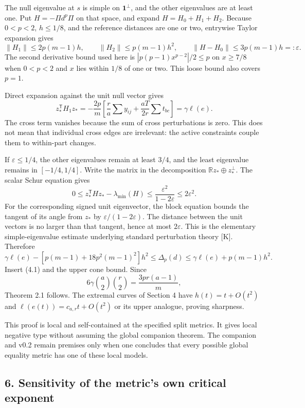 \documentclass[11pt,a4paper]{article}
\begin{document}
The null eigenvalue at \(s\) is simple on \(\mathbf1^\perp\), and the
other eigenvalues are at least one. Put \(H=-\Pi d^p\Pi\) on that space,
and expand \(H=H_0+H_1+H_2\). Because \(0<p<2\), \(h\le1/8\), and the
reference distances are one or two, entrywise Taylor expansion gives
\[\|H_1\|\le2p(m-1)h,\qquad
\|H_2\|\le p(m-1)h^2,\qquad
\|H-H_0\|\le3p(m-1)h=:\varepsilon.\] The second derivative bound used
here is \(|p(p-1)x^{p-2}|/2\le p\) on \(x\ge7/8\) when \(0<p<2\) and
\(x\) lies within \(1/8\) of one or two. This loose bound also covers
\(p=1\).

Direct expansion against the unit null vector gives
\[z_*^{\mathsf T}H_1z_*
=-\frac{2p}{m}\left[\frac ra\sum y_{ij}
+\frac{aT}{2r}\sum t_{bc}\right]=\gamma\ell(e).\] The cross term
vanishes because the sum of cross perturbations is zero. This does not
mean that individual cross edges are irrelevant: the active constraints
couple them to within-part changes.

If \(\varepsilon\le1/4\), the other eigenvalues remain at least \(3/4\),
and the least eigenvalue remains in \([-1/4,1/4]\). Write the matrix in
the decomposition \(\mathbb Rz_*\oplus z_*^\perp\). The scalar Schur
equation gives \[0\le z_*^{\mathsf T}Hz_*-\lambda_{\min}(H)
\le\frac{\varepsilon^2}{1-2\varepsilon}\le2\varepsilon^2.\] For the
corresponding signed unit eigenvector, the block equation bounds the
tangent of its angle from \(z_*\) by \(\varepsilon/(1-2\varepsilon)\).
The distance between the unit vectors is no larger than that tangent,
hence at most \(2\varepsilon\). This is the elementary simple-eigenvalue
estimate underlying standard perturbation theory {[}K{]}. Therefore
\[\gamma\ell(e)-[p(m-1)+18p^2(m-1)^2]h^2
\le\Delta_p(d)\le\gamma\ell(e)+p(m-1)h^2.\] Insert (4.1) and the upper
cone bound. Since \[6\gamma\binom a2\binom r2=\frac{3pr(a-1)}m,\]
Theorem 2.1 follows. The extremal curves of Section 4 have
\(h(t)=t+O(t^2)\) and \(\ell(e(t))=c_{a,r}t+O(t^2)\) or its upper
analogue, proving sharpness.

This proof is local and self-contained at the specified split metrics.
It gives local negative type without assuming the global companion
theorem. The companion and v0.2 remain premises only when one concludes
that every possible global equality metric has one of these local
models.

\subsection{6. Sensitivity of the metric's own critical
exponent}\label{sensitivity-of-the-metrics-own-critical-exponent}
\end{document}

